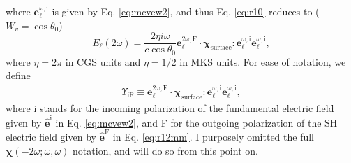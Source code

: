 where $\mathbf{e}^{\omega,\mathrm{i}}_{\ell}$ is given by Eq. \eqref{eq:mcvew2},
and thus Eq. \eqref{eq:r10} reduces to ($W_{v}=\cos\theta_{0}$)
\begin{equation}\label{eq:mr10}
E_{\ell}(2\omega) 
= \frac{2\eta i \omega}{c\cos\theta_{0}}
\mathbf{e}^{2\omega,\mathrm{F}}_{\ell}\cdot
\boldsymbol{\chi}_{\mathrm{surface}}:\mathbf{e}^{\omega,\mathrm{i}}_{\ell}
                  \mathbf{e}^{\omega,\mathrm{i}}_{\ell},
\end{equation}
where $\eta=2\pi$ in CGS units and $\eta=1/2$ in MKS units. For ease of
notation, we define
\begin{align}\label{eq:mc0}
\Upsilon_{\mathrm{iF}}
\equiv 
\mathbf{e}^{2\omega,\mathrm{F}}_{\ell}\cdot
\boldsymbol{\chi}_{\mathrm{surface}}:\mathbf{e}^{\omega,\mathrm{i}}_{\ell}
                  \mathbf{e}^{\omega,\mathrm{i}}_{\ell},
\end{align}
where i stands for the incoming polarization of the fundamental electric field
given by $\hat{\mathbf{e}}^{\mathrm{i}}$ in Eq. \eqref{eq:mcvew2}, and F for the
outgoing polarization of the SH electric field given by
$\hat{\mathbf{e}}^{\mathrm{F}}$ in Eq. \eqref{eq:r12mm}. I purposely omitted the
full $\boldsymbol{\chi}(-2\omega;\omega,\omega)$ notation, and will do so from
this point on.

